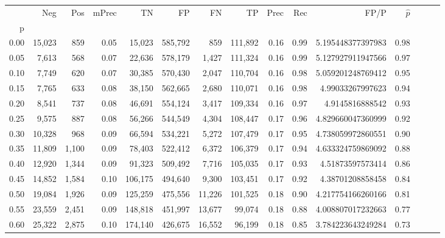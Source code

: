 \begin{tabular}{rrrrrrrrrrrrrrr}
\toprule
{} &     Neg &     Pos & mPrec &       TN &       FP &       FN &       TP &  Prec &   Rec &                 FP/P & $\hat{p}$ \\
p    &         &         &       &          &          &          &          &       &       &                      &           \\
\midrule
0.00 &  15,023 &     859 &  0.05 &   15,023 &  585,792 &      859 &  111,892 &  0.16 &  0.99 &    5.195448377397983 &      0.98 \\
0.05 &   7,613 &     568 &  0.07 &   22,636 &  578,179 &    1,427 &  111,324 &  0.16 &  0.99 &    5.127927911947566 &      0.97 \\
0.10 &   7,749 &     620 &  0.07 &   30,385 &  570,430 &    2,047 &  110,704 &  0.16 &  0.98 &    5.059201248769412 &      0.95 \\
0.15 &   7,765 &     633 &  0.08 &   38,150 &  562,665 &    2,680 &  110,071 &  0.16 &  0.98 &     4.99033267997623 &      0.94 \\
0.20 &   8,541 &     737 &  0.08 &   46,691 &  554,124 &    3,417 &  109,334 &  0.16 &  0.97 &      4.9145816888542 &      0.93 \\
0.25 &   9,575 &     887 &  0.08 &   56,266 &  544,549 &    4,304 &  108,447 &  0.17 &  0.96 &    4.829660047360999 &      0.92 \\
0.30 &  10,328 &     968 &  0.09 &   66,594 &  534,221 &    5,272 &  107,479 &  0.17 &  0.95 &    4.738059972860551 &      0.90 \\
0.35 &  11,809 &   1,100 &  0.09 &   78,403 &  522,412 &    6,372 &  106,379 &  0.17 &  0.94 &    4.633324759869092 &      0.88 \\
0.40 &  12,920 &   1,344 &  0.09 &   91,323 &  509,492 &    7,716 &  105,035 &  0.17 &  0.93 &     4.51873597573414 &      0.86 \\
0.45 &  14,852 &   1,584 &  0.10 &  106,175 &  494,640 &    9,300 &  103,451 &  0.17 &  0.92 &     4.38701208858458 &      0.84 \\
0.50 &  19,084 &   1,926 &  0.09 &  125,259 &  475,556 &   11,226 &  101,525 &  0.18 &  0.90 &    4.217754166260166 &      0.81 \\
0.55 &  23,559 &   2,451 &  0.09 &  148,818 &  451,997 &   13,677 &   99,074 &  0.18 &  0.88 &    4.008807017232663 &      0.77 \\
0.60 &  25,322 &   2,875 &  0.10 &  174,140 &  426,675 &   16,552 &   96,199 &  0.18 &  0.85 &    3.784223643249284 &      0.73 \\

\end{tabular}
